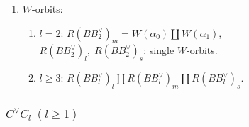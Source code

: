 \documentclass[11pt]{amsart}
\begin{document}
{\begin{enumerate}
\begin{enumerate}
\begin{center}
\end{center}
\end{enumerate}
\item $W$-orbits: 
\begin{enumerate}
\item[i)] $l=2$: $R(BB_2^\vee)_m=W(\alpha_0) \amalg W(\alpha_1)$, \\
\phantom{$l=2$\, } $R(BB_2^{\vee})_l, \; R(BB_2^{\vee})_s$:\; single $W$-orbits.
\item[ii)] $l\geq 3$: $R(BB_l^{\vee})_l \amalg R(BB_l^{\vee})_m \amalg R(BB_l^{\vee})_s$.
\end{enumerate}
\end{enumerate}

\subsubsection{$C^\vee C_l\; (l\geq 1)$}\label{sect:CveeC_l}


}
\end{document}
